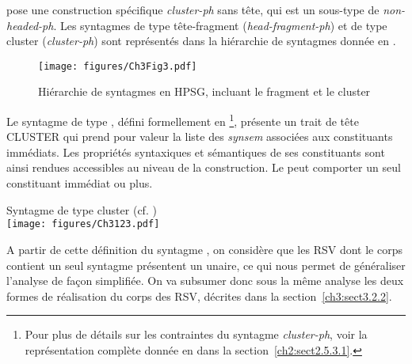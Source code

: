 \z

\citet{Mouret2006,Mouret2007} pose une construction spécifique \textit{cluster-ph} sans tête, qui est un sous-type de \textit{non-headed-ph}. Les syntagmes de type tête-fragment (\textit{head-fragment-ph}) et de type cluster (\textit{cluster-ph}) sont représentés dans la hiérarchie de syntagmes donnée en . 

\begin{figure}
\texttt{[image: figures/Ch3Fig3.pdf]} %
\caption{Hiérarchie de syntagmes en HPSG, incluant le fragment et le cluster}
\label{ch3:fig3}
\end{figure} 

Le syntagme de type , défini formellement en \footnote{Pour plus de détails sur les contraintes du syntagme \textit{cluster-ph}, voir la représentation complète donnée en  dans la section~\ref{ch2:sect2.5.3.1}.}, présente un trait de tête CLUSTER qui prend pour valeur la liste des \textit{synsem} associées aux constituants immédiats. Les propriétés syntaxiques et sémantiques de ses constituants sont ainsi rendues accessibles au niveau de la construction. Le  peut comporter un seul constituant immédiat ou plus. 

\ea \label{ch3:ex123}
Syntagme de type cluster (cf. \citealt{Mouret2006,Mouret2007})\\
\texttt{[image: figures/Ch3123.pdf]}

 

\z

A partir de cette définition du syntagme , on considère que les RSV dont le corps contient un seul syntagme présentent un  unaire, ce qui nous permet de généraliser l’analyse de façon simplifiée. On va subsumer donc sous la même analyse les deux formes de réalisation du corps des RSV, décrites dans la section~\ref{ch3:sect3.2.2}. 

